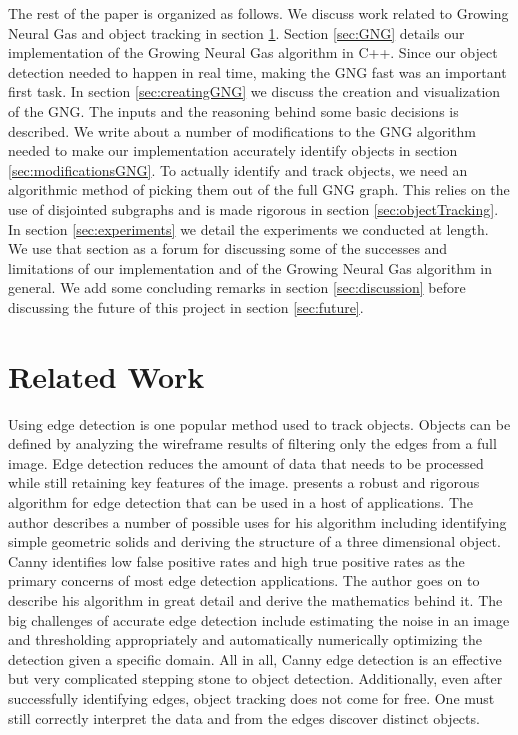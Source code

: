 \documentclass{article}
\renewcommand{\|}{\origbar} %
\begin{document}
The rest of the paper is organized as follows. We discuss work related to Growing Neural Gas and object tracking in section \ref{sec:relatedWork}. Section \ref{sec:GNG} details our implementation of the Growing Neural Gas algorithm in C++. Since our object detection needed to happen in real time, making the GNG fast was an important first task. In section \ref{sec:creatingGNG} we discuss the creation and visualization of the GNG. The inputs and the reasoning behind some basic decisions is described. We write about a number of modifications to the GNG algorithm needed to make our implementation accurately identify objects in section \ref{sec:modificationsGNG}. To actually identify and track objects, we need an algorithmic method of picking them out of the full GNG graph. This relies on the use of disjointed subgraphs and is made rigorous in section \ref{sec:objectTracking}. In section \ref{sec:experiments} we detail the experiments we conducted at length. We use that section as a forum for discussing some of the successes and limitations of our implementation and of the Growing Neural Gas algorithm in general. We add some concluding remarks in section \ref{sec:discussion} before discussing the future of this project in section \ref{sec:future}.

\section{Related Work}
\label{sec:relatedWork}


Using edge detection is one popular method used to track objects. Objects can be defined by analyzing the wireframe results of filtering only the edges from a full image. Edge detection reduces the amount of data that needs to be processed while still retaining key features of the image.  presents a robust and rigorous algorithm for edge detection that can be used in a host of applications. The author describes a number of possible uses for his algorithm including identifying simple geometric solids and deriving the structure of a three dimensional object. Canny identifies low false positive rates and high true positive rates as the primary concerns of most edge detection applications. The author goes on to describe his algorithm in great detail and derive the mathematics behind it. The big challenges of accurate edge detection include estimating the noise in an image and thresholding appropriately and automatically numerically optimizing the detection given a specific domain. All in all, Canny edge detection is an effective but very complicated stepping stone to object detection. Additionally, even after successfully identifying edges, object tracking does not come for free. One must still correctly interpret the data and from the edges discover distinct objects.
\end{document}
